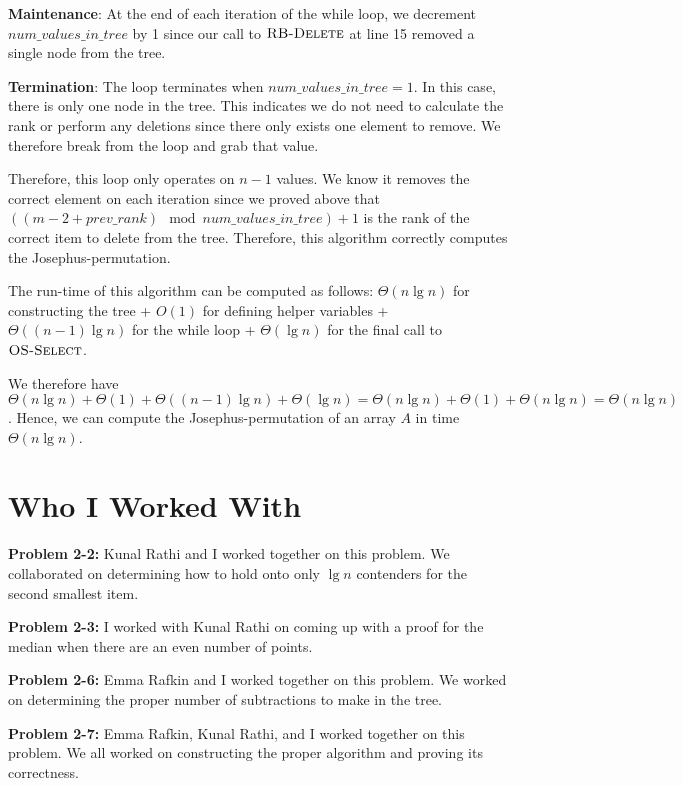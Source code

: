\documentclass[11pt]{article}
\begin{document}
\textbf{Maintenance}: At the end of each iteration of the while loop, we decrement $num\_values\_in\_tree$ by 1 since our call to $\textnormal{\scshape RB-Delete}$ at line 15 removed a single node from the tree.

\textbf{Termination}: The loop terminates when $num\_values\_in\_tree = 1$. In this case, there is only one node in the tree. This indicates we do not need to calculate the rank or perform any deletions since there only exists one element to remove. We therefore break from the loop and grab that value.

Therefore, this loop only operates on $n-1$ values. We know it removes the correct element on each iteration since we proved above that $((m - 2 + prev\_rank) \mod num\_values\_in\_tree) + 1$ is the rank of the correct item to delete from the tree. Therefore, this algorithm correctly computes the Josephus-permutation.

The run-time of this algorithm can be computed as follows: $\Theta(n\lg{n})$ for constructing the tree + $O(1)$ for defining helper variables + $\Theta((n-1)\lg{n})$ for the while loop + $\Theta(\lg{n})$ for the final call to $\textnormal{\scshape OS-Select}$.

We therefore have $\Theta(n\lg{n}) + \Theta(1) + \Theta((n-1)\lg{n}) + \Theta(\lg{n}) = \Theta(n\lg{n}) + \Theta(1) + \Theta(n\lg{n}) = \Theta(n\lg{n})$. Hence, we can compute the Josephus-permutation of an array $A$ in time $\Theta(n\lg{n})$.

\newpage

\section{Who I Worked With}

\textbf{Problem 2-2:} Kunal Rathi and I worked together on this problem. We collaborated on determining how to hold onto only $\lg{n}$ contenders for the second smallest item.

\textbf{Problem 2-3:} I worked with Kunal Rathi on coming up with a proof for the median when there are an even number of points.

\textbf{Problem 2-6:} Emma Rafkin and I worked together on this problem. We worked on determining the proper number of subtractions to make in the tree.

\textbf{Problem 2-7:} Emma Rafkin, Kunal Rathi, and I worked together on this problem. We all worked on constructing the proper algorithm and proving its correctness.
\end{document}
